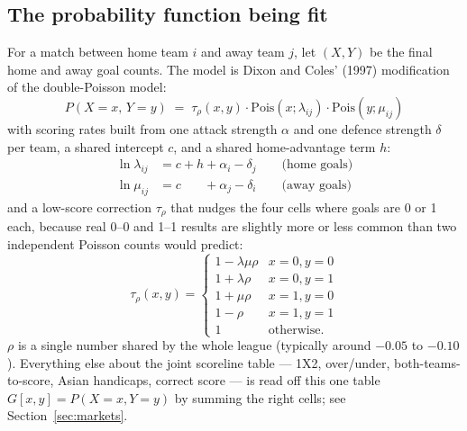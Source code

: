\documentclass[11pt]{article}
\begin{document}
\subsection{The probability function being fit}
For a match between home team $i$ and away team $j$, let $(X,Y)$ be the final home and away goal
counts. The model is Dixon and Coles' (1997) modification of the double-Poisson model:
\begin{equation}
P(X=x,\,Y=y)\;=\;\tau_\rho(x,y)\cdot \mathrm{Pois}(x;\lambda_{ij})\cdot \mathrm{Pois}(y;\mu_{ij})
\end{equation}
with scoring rates built from one attack strength $\alpha$ and one defence strength $\delta$ per
team, a shared intercept $c$, and a shared home-advantage term $h$:
\begin{align}
\ln \lambda_{ij} &= c + h + \alpha_i - \delta_j \qquad \text{(home goals)}\\
\ln \mu_{ij} &= c \phantom{{}+h{}} + \alpha_j - \delta_i \qquad \text{(away goals)}
\end{align}
and a low-score correction $\tau_\rho$ that nudges the four cells where goals are 0 or 1 each,
because real 0--0 and 1--1 results are slightly more or less common than two independent Poisson
counts would predict:
\begin{equation}
\tau_\rho(x,y)=
\begin{cases}
1-\lambda\mu\rho & x=0,y=0\\
1+\lambda\rho & x=0,y=1\\
1+\mu\rho & x=1,y=0\\
1-\rho & x=1,y=1\\
1 & \text{otherwise.}
\end{cases}
\end{equation}
$\rho$ is a single number shared by the whole league (typically around $-0.05$ to $-0.10$).
Everything else about the joint scoreline table --- 1X2, over/under, both-teams-to-score, Asian
handicaps, correct score --- is read off this one table $G[x,y]=P(X{=}x,Y{=}y)$ by summing the
right cells; see Section~\ref{sec:markets}.
\end{document}
